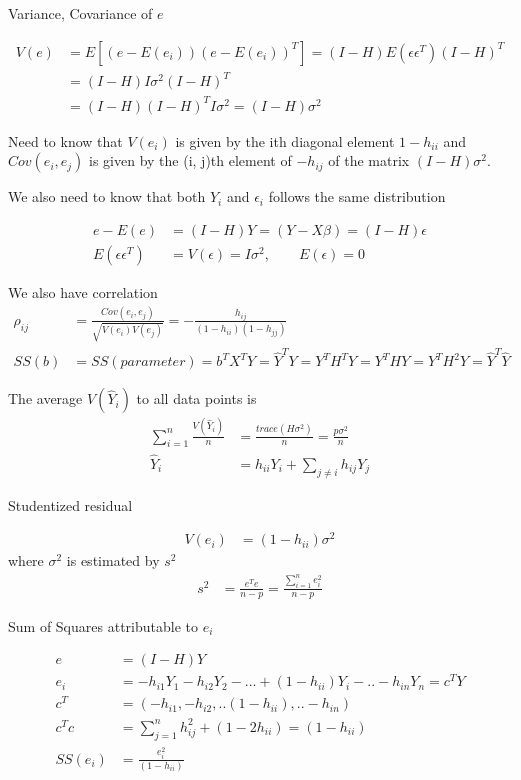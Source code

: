 \documentclass[11pt]{article} %
\begin{document}
Variance, Covariance of $e$

\begin{align*}
	V(e) &= E[(e - E(e_i)) (e - E(e_i))^T] = (I-H) E(\epsilon \epsilon^T) (I-H)^T \\
	&= (I-H) I \sigma^2 (I-H)^T \\
	&= (I-H)  (I-H)^T  I \sigma^2 = (I-H) \sigma^2
\end{align*} 

Need to know that $V(e_i)$ is given by the ith diagonal element $1 - h_{ii}$  and $Cov(e_i ,e_j )$ is given by the (i, j)th  element of $ -h_{ij}$ of the matrix $(I-H) \sigma^2$.

We also need to know that both $Y_i$ and $\epsilon_i$ follows the same distribution

\begin{align*}
	e - E(e) &= (I-H) Y = (Y- X\beta) = (I-H) \epsilon \\
	E(\epsilon \epsilon^T) &= V(\epsilon) = I\sigma^2 , \qquad E(\epsilon) = 0
\end{align*} 

We also have correlation
\begin{align*}
   \rho_{ij} &= \frac{Cov(e_i, e_j)}{\sqrt{V(e_i)V(e_j)}} = -\frac{h_{ij}}{(1-h_{ii}) (1-h_{jj})} \\
   SS(b) &= SS(parameter) = b^T X^T Y = \hat{Y}^T Y = Y^T H^T Y =  Y^T H Y =  Y^T H^2 Y = \hat{Y}^T \hat{Y}
\end{align*} 

The average $V(\hat{Y}_i)$ to all data points is
\begin{align*}
	\sum_{i=1}^n \frac{V(\hat{Y}_i)}{n} &= \frac{trace(H \sigma^2)}{n} = \frac{p \sigma^2}{n} \\
	\hat{Y}_i &= h_{ii}Y_i + \sum_{j \neq i} h_{ij} Y_j
\end{align*} 

Studentized residual

\begin{align*}
	 V(e_i) & = (1- h_{ii}) \sigma^2 
\end{align*} 
where $\sigma^2$ is estimated by $s^2$
\begin{align*}
 s^2 & = \frac{e^T e}{n-p} = \frac{\sum_{i=1}^n e_i^2}{n-p}
\end{align*} 

Sum of Squares attributable to $e_i$

\begin{align*}
	e & = (I-H)Y\\
	e_i &= -h_{i1} Y_1 - h_{i2} Y_2 - ... + (1- h_{ii}) Y_i -.. -h_{in} Y_n = c^T Y\\
	c^T &= ( -h_{i1}, - h_{i2}, ..  (1- h_{ii}), .. -h_{in})\\
	c^T c &= \sum_{j=1}^n h_{ij}^2 + (1- 2h_{ii}) = (1-h_{ii})\\
	SS(e_i) &= \frac{e_i^2}{(1-h_{ii})}
\end{align*} 
\end{document}
